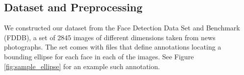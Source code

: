 \documentclass[11pt]{article}
\begin{document}
\subsection{Dataset and Preprocessing}


We constructed our dataset from the Face Detection Data Set and Benchmark (FDDB)\cite{fddbTech}, a set of 2845 images of different dimensions taken from news photographs. The set comes with files that define annotations locating a bounding ellipse for each face in each of the images. See Figure \ref{fig:sample_ellipse} for an example such annotation.
 \begin{figure}[H]
     \begin{center}
%
        \\%
        \\%
\end{center}
\end{figure}
\end{document}
